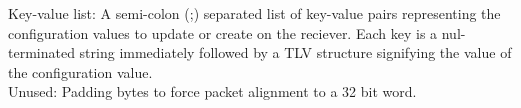 \documentclass[11pt]{article}
\begin{document}
\newline
Key-value list: A semi-colon (;) separated list of key-value pairs representing the configuration values to 
update or create on the reciever.
Each key is a nul-terminated string immediately followed by a TLV structure signifying the value of the configuration value.\\
Unused:  Padding bytes to force packet alignment to a 32 bit word.
\end{document}
